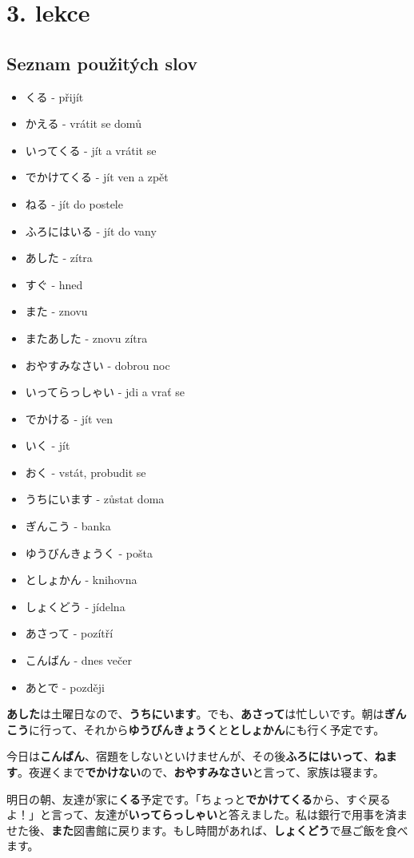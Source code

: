 \section{3. lekce}

\subsection*{Seznam použitých slov}

\begin{itemize}
    \item くる - přijít
    \item かえる - vrátit se domů
    \item いってくる - jít a vrátit se
    \item でかけてくる - jít ven a zpět
    \item ねる - jít do postele
    \item ふろにはいる - jít do vany
    \item あした - zítra
    \item すぐ - hned
    \item また - znovu
    \item またあした - znovu zítra
    \item おやすみなさい - dobrou noc
    \item いってらっしゃい - jdi a vrať se
    \item でかける - jít ven
    \item いく - jít
    \item おく - vstát, probudit se
    \item うちにいます - zůstat doma
    \item ぎんこう - banka
    \item ゆうびんきょうく - pošta
    \item としょかん - knihovna
    \item しょくどう - jídelna
    \item あさって - pozítří
    \item こんばん - dnes večer
    \item あとで - později
\end{itemize}

\textbf{あした}は土曜日なので、\textbf{うちにいます}。でも、\textbf{あさって}は忙しいです。朝は\textbf{ぎんこう}に行って、それから\textbf{ゆうびんきょうく}と\textbf{としょかん}にも行く予定です。

今日は\textbf{こんばん}、宿題をしないといけませんが、その後\textbf{ふろにはいって}、\textbf{ねます}。夜遅くまで\textbf{でかけない}ので、\textbf{おやすみなさい}と言って、家族は寝ます。

明日の朝、友達が家に\textbf{くる}予定です。「ちょっと\textbf{でかけてくる}から、すぐ戻るよ！」と言って、友達が\textbf{いってらっしゃい}と答えました。私は銀行で用事を済ませた後、\textbf{また}図書館に戻ります。もし時間があれば、\textbf{しょくどう}で昼ご飯を食べます。

